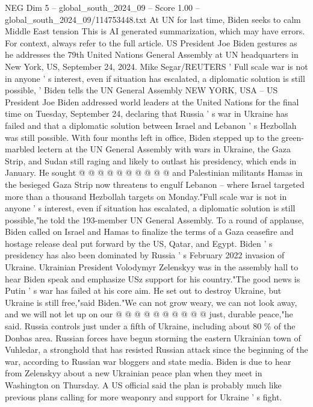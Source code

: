 \begin{textsample}{NEG Dim 5 – global\_south\_2024\_09 – Score 1.00 – global\_south\_2024\_09/114753448.txt}  \label{ex:f5_neg_226}
At UN for last time, Biden seeks to calm Middle East tension This is AI generated summarization, which may have errors.
For context, always refer to the full article.
US President Joe Biden gestures as he addresses the 79th United Nations General Assembly at UN headquarters in New York, US, September 24, 2024.
Mike Segar/REUTERS ' Full scale war is not in anyone ' s interest, even if situation has escalated, a diplomatic solution is still possible, ' Biden tells the UN General Assembly NEW YORK, USA -- US President Joe Biden addressed world leaders at the United Nations for the final time on Tuesday, September 24, declaring that Russia ' s war in Ukraine has failed and that a diplomatic solution between Israel and Lebanon ' s Hezbollah was still possible.
With four months left in office, Biden stepped up to the green-marbled lectern at the UN General Assembly with wars in Ukraine, the Gaza Strip, and Sudan still raging and likely to outlast his presidency, which ends in January.
He sought @ @ @ @ @ @ @ @ @ @ and Palestinian militants Hamas in the besieged Gaza Strip now threatens to engulf Lebanon -- where Israel targeted more than a thousand Hezbollah targets on Monday."Full scale war is not in anyone ' s interest, even if situation has escalated, a diplomatic solution is still possible,"he told the 193-member UN General Assembly.
To a round of applause, Biden called on Israel and Hamas to finalize the terms of a Gaza ceasefire and hostage release deal put forward by the US, Qatar, and Egypt.
Biden ' s presidency has also been dominated by Russia ' s February 2022 invasion of Ukraine.
Ukrainian President Volodymyr Zelenskyy was in the assembly hall to hear Biden speak and emphasize USz support for his country."The good news is Putin ' s war has failed at his core aim.
He set out to destroy Ukraine, but Ukraine is still free,"said Biden."We can not grow weary, we can not look away, and we will not let up on our @ @ @ @ @ @ @ @ @ @ just, durable peace,"he said.
Russia controls just under a fifth of Ukraine, including about 80 \% of the Donbas area.
Russian forces have begun storming the eastern Ukrainian town of Vuhledar, a stronghold that has resisted Russian attack since the beginning of the war, according to Russian war bloggers and state media.
Biden is due to hear from Zelenskyy about a new Ukrainian peace plan when they meet in Washington on Thursday.
A US official said the plan is probably much like previous plans calling for more weaponry and support for Ukraine ' s fight.

\end{textsample}
